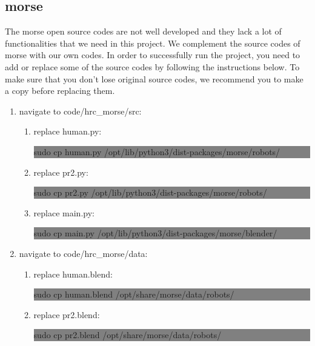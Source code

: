 \subsection{morse}
The morse open source codes are not well developed and they lack a lot of functionalities that we need in this project. We complement the source codes of morse with our own codes. In order to successfully run the project, you need to add or replace some of the source codes by following the instructions below. To make sure that you don't lose original source codes, we recommend you to make a copy before replacing them.
\begin{enumerate}\setlength{\itemsep}{0.05cm}
\item navigate to code/hrc\_morse/src:
	\begin{enumerate}\setlength{\itemsep}{0.02cm}
	\item replace human.py:\\
	\colorbox{gray}{\begin{minipage}{\linewidth} sudo cp human.py /opt/lib/python3/dist-packages/morse/robots/ \end{minipage}}
	\item replace pr2.py: \\
	\colorbox{gray}{\begin{minipage}{\linewidth} sudo cp pr2.py /opt/lib/python3/dist-packages/morse/robots/ \end{minipage}}
	\item replace main.py: \\
	\colorbox{gray}{\begin{minipage}{\linewidth} sudo cp main.py /opt/lib/python3/dist-packages/morse/blender/ \end{minipage}}
	\end{enumerate}
\item navigate to code/hrc\_morse/data:
	\begin{enumerate}\setlength{\itemsep}{0.02cm}
	\item replace human.blend: \\
	\colorbox{gray}{\begin{minipage}{\linewidth} sudo cp human.blend /opt/share/morse/data/robots/  \end{minipage}}
	\item replace pr2.blend: \\
	\colorbox{gray}{\begin{minipage}{\linewidth} sudo cp pr2.blend /opt/share/morse/data/robots/  \end{minipage}}

\end{enumerate}
\end{enumerate}
